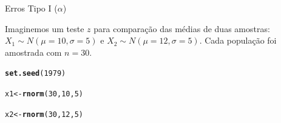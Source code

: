\documentclass{beamer}\usepackage[]{graphicx}\usepackage[]{color}
\makeatletter
\newcommand{\hlnum}[1]{\textcolor[rgb]{0.686,0.059,0.569}{#1}}%
\newcommand{\hlstd}[1]{\textcolor[rgb]{0.345,0.345,0.345}{#1}}%
\newcommand{\hlkwb}[1]{\textcolor[rgb]{0.69,0.353,0.396}{#1}}%
\newcommand{\hlkwd}[1]{\textcolor[rgb]{0.737,0.353,0.396}{\textbf{#1}}}%
\newenvironment{kframe}{%
 \def\at@end@of@kframe{}%
 \ifinner\ifhmode%
  \def\at@end@of@kframe{\end{minipage}}%
  \begin{minipage}{\columnwidth}%
 \fi\fi%
 \def\FrameCommand##1{\hskip\@totalleftmargin \hskip-\fboxsep
 \colorbox{shadecolor}{##1}\hskip-\fboxsep
     \hskip-\linewidth \hskip-\@totalleftmargin \hskip\columnwidth}%
 \MakeFramed {\advance\hsize-\width
   \@totalleftmargin\z@ \linewidth\hsize
   \@setminipage}}%
 {\par\unskip\endMakeFramed%
 \at@end@of@kframe}
\newenvironment{knitrout}{}{} %
\renewenvironment{knitrout}{\setlength{\topsep}{0mm}}{}
\makeatother
\begin{document}
\begin{frame}{Erros Tipo I ($\alpha$)}

Imaginemos um teste $z$ para comparação das médias de duas amostras:
\vfill
$X_1 \sim N(\mu=10,\sigma=5)$ e $X_2 \sim N(\mu=12,\sigma=5)$. 
\vfill
Cada população foi amostrada com $n = 30$.
\vfill  
\begin{knitrout}\small
{}\color{fgcolor}\begin{kframe}
\begin{alltt}
\hlkwd{set.seed}\hlstd{(}\hlnum{1979}\hlstd{)}

\hlstd{x1} \hlkwb{<-} \hlkwd{rnorm}\hlstd{(}\hlnum{30}\hlstd{,} \hlnum{10}\hlstd{,} \hlnum{5}\hlstd{)}

\hlstd{x2} \hlkwb{<-} \hlkwd{rnorm}\hlstd{(}\hlnum{30}\hlstd{,} \hlnum{12}\hlstd{,} \hlnum{5}\hlstd{)}
\end{alltt}
\end{kframe}
\end{knitrout}


\end{frame}
\end{document}
